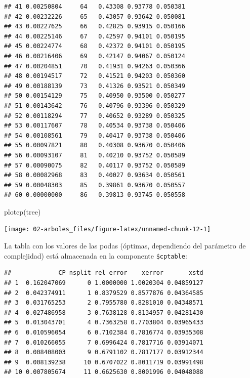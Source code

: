 \documentclass[
  spanish,
]{book}
\newenvironment{Shaded}{\begin{snugshade}}{\end{snugshade}}
\newcommand{\DecValTok}[1]{\textcolor[rgb]{0.00,0.00,0.81}{#1}}
\newcommand{\FunctionTok}[1]{\textcolor[rgb]{0.00,0.00,0.00}{#1}}
\newcommand{\NormalTok}[1]{#1}
\newcommand{\SpecialCharTok}[1]{\textcolor[rgb]{0.00,0.00,0.00}{#1}}
\theoremstyle{break}
\theoremstyle{definition}
\theoremstyle{definition}
\theoremstyle{definition}
\theoremstyle{definition}
\theoremstyle{remark}
\begin{document}
\begin{verbatim}
## 41 0.00250804     64   0.43308 0.93778 0.050381
## 42 0.00232226     65   0.43057 0.93642 0.050081
## 43 0.00227625     66   0.42825 0.93915 0.050166
## 44 0.00225146     67   0.42597 0.94101 0.050195
## 45 0.00224774     68   0.42372 0.94101 0.050195
## 46 0.00216406     69   0.42147 0.94067 0.050124
## 47 0.00204851     70   0.41931 0.94263 0.050366
## 48 0.00194517     72   0.41521 0.94203 0.050360
## 49 0.00188139     73   0.41326 0.93521 0.050349
## 50 0.00154129     75   0.40950 0.93500 0.050277
## 51 0.00143642     76   0.40796 0.93396 0.050329
## 52 0.00118294     77   0.40652 0.93289 0.050325
## 53 0.00117607     78   0.40534 0.93738 0.050406
## 54 0.00108561     79   0.40417 0.93738 0.050406
## 55 0.00097821     80   0.40308 0.93670 0.050406
## 56 0.00093107     81   0.40210 0.93752 0.050589
## 57 0.00090075     82   0.40117 0.93752 0.050589
## 58 0.00082968     83   0.40027 0.93634 0.050561
## 59 0.00048303     85   0.39861 0.93670 0.050557
## 60 0.00000000     86   0.39813 0.93745 0.050558
\end{verbatim}

\begin{Shaded}
\begin{Highlighting}[]
\FunctionTok{plotcp}\NormalTok{(tree)}
\end{Highlighting}
\end{Shaded}

\begin{center}\texttt{[image: 02-arboles\_files/figure-latex/unnamed-chunk-12-1]} \end{center}

La tabla con los valores de las podas (óptimas, dependiendo del parámetro de complejidad)
está almacenada en la componente \texttt{\$cptable}:

\begin{Shaded}
\end{Shaded}

\begin{verbatim}
##             CP nsplit rel error    xerror       xstd
## 1  0.162047069      0 1.0000000 1.0020304 0.04859127
## 2  0.042374911      1 0.8379529 0.8577876 0.04364585
## 3  0.031765253      2 0.7955780 0.8281010 0.04348571
## 4  0.027486958      3 0.7638128 0.8134957 0.04281430
## 5  0.013043701      4 0.7363258 0.7703804 0.03965433
## 6  0.010596054      6 0.7102384 0.7816774 0.03935308
## 7  0.010266055      7 0.6996424 0.7817716 0.03914071
## 8  0.008408003      9 0.6791102 0.7817177 0.03912344
## 9  0.008139238     10 0.6707022 0.8011719 0.03991498
## 10 0.007805674     11 0.6625630 0.8001996 0.04048088
\end{verbatim}
\end{document}
